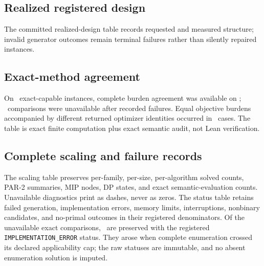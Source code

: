 \subsection{Realized registered design}

The committed realized-design table records requested and measured structure;
invalid generator outcomes remain terminal failures rather than silently
repaired instances.

\begin{landscape}

\end{landscape}

\begin{landscape}
\subsection{Exact-method agreement}

On \AORExactCapable\ exact-capable instances, complete burden agreement was
available on \AORExactAgreement; \AORExactUnavailable\ comparisons were
unavailable after recorded failures. Equal objective burdens accompanied by
different returned optimizer identities occurred in
\AOROptimizerIdentityDifferences\ cases. The table is exact finite
computation plus exact semantic audit, not Lean verification.


\end{landscape}

\begin{landscape}
\subsection{Complete scaling and failure records}

The scaling table preserves per-family, per-size, per-algorithm solved counts,
PAR-2 summaries, MIP nodes, DP states, and exact semantic-evaluation counts.
Unavailable diagnostics print as dashes, never as zeros. The status table
retains failed generation, implementation errors, memory limits, interruptions,
nonbinary candidates, and no-primal outcomes in their registered denominators.
Of the unavailable exact comparisons, \AORImplementationErrors\ are preserved
with the registered \texttt{IMPLEMENTATION\_ERROR} status. They arose when
complete enumeration crossed its declared applicability cap; the raw statuses
are immutable, and no absent enumeration solution is imputed.


\end{landscape}

